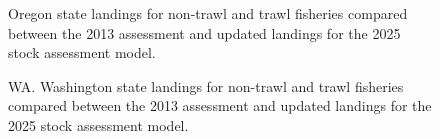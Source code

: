 \documentclass[
]{scrartcl}
\begin{document}
\begin{figure}[H]


\caption{\label{fig-Ct_OR}Oregon state landings for non-trawl and trawl
fisheries compared between the 2013 assessment and updated landings for
the 2025 stock assessment model.}

\end{figure}%

\begin{figure}[H]


\caption{\label{fig-Ct_WA}WA. Washington state landings for non-trawl
and trawl fisheries compared between the 2013 assessment and updated
landings for the 2025 stock assessment model.}

\end{figure}%
\end{document}
